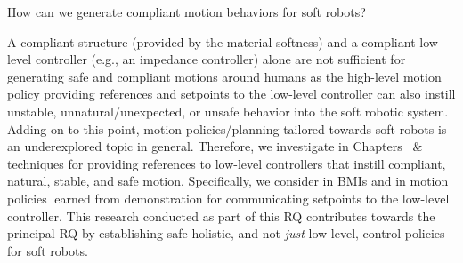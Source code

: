 \begin{researchquestion}\label{rq:compliant_motion_behaviors}
    How can we generate compliant motion behaviors for soft robots?
\end{researchquestion}
A compliant structure (provided by the material softness) and a compliant low-level controller (e.g., an impedance controller) alone are not sufficient for generating safe and compliant motions around humans as the high-level motion policy providing references and setpoints to the low-level controller can also instill unstable, unnatural/unexpected, or unsafe behavior into the soft robotic system.
Adding on to this point, motion policies/planning tailored towards soft robots is an underexplored topic in general.
Therefore, we investigate in Chapters~\circled{\ref{chp:braincontrol}} \& \circled{\ref{chp:osmp}} techniques for providing references to low-level controllers that instill compliant, natural, stable, and safe motion.
Specifically, we consider in \circled{\ref{chp:braincontrol}} \glspl{BMI} and in \circled{\ref{chp:osmp}} motion policies learned from demonstration for communicating setpoints to the low-level controller.
This research conducted as part of this \gls{RQ} contributes towards the principal \gls{RQ} by establishing safe holistic, and not \emph{just} low-level, control policies for soft robots.

